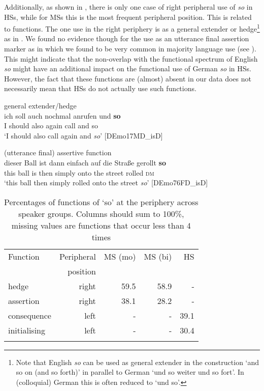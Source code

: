 \documentclass[output=paper,colorlinks,citecolor=brown]{langscibook}
\begin{document}
\noindent Additionally, as shown in , there is only one case of right peripheral use of \textit{so} in HSs, while for MSs this is the most frequent peripheral position. This is related to functions. The one use in the right periphery is as a general extender or hedge\footnote{Note that English \textit{so} can be used as general extender in the construction ‘and so on (and so forth)’ in parallel to German ‘und so weiter und so fort’. In (colloquial) German this is often reduced to ‘und so’.} as in . We found no evidence though for the use as an utterance final assertion marker as in  which we found to be very common in majority language use (see ). This might indicate that the non-overlap with the functional spectrum of English \textit{so} might have an additional impact on the functional use of German \textit{so} in HSs. However, the fact that these functions are (almost) absent in our data does not necessarily mean that HSs do not actually use such functions. 

\ea general extender/hedge\label{ex:labrenzetal:13}\\
\gll ich soll auch nochmal anrufen und \textbf{so}\\ I should also again call and so\\
\glt ‘I should also call again and \textit{so}’ \hfill[DEmo17MD\_isD]
\z

\ea (utterance final) assertive function\label{ex:labrenzetal:14}\\
\gll dieser Ball ist dann einfach auf die Straße gerollt \textbf{so}\\ this ball is then simply onto the street rolled \textsc{dm}\\
\glt ‘this ball then simply rolled onto the street \textit{so}’ \hfill[DEmo76FD\_isD]
\z

\begin{table}
\caption{Percentages of functions of `so' at the periphery across speaker groups. Columns should sum to 100\%, missing values are functions that occur less than 4 times}
\label{tab:labrenzetal:4}
 \begin{tabularx}{.8\textwidth}{X rrrr}
  \lsptoprule
  Function  & Peripheral & MS (mo)  & MS (bi) & HS\\
  & position & & & \\
  \midrule
  hedge  &   right  &    59.5  &    58.9      & -\\
  assertion  &   right &   38.1  &    28.2     & -\\
  consequence  &   left &   -  &    -     & 39.1\\
  initialising  &   left &   -  &    -     & 30.4\\
  \lspbottomrule
 \end{tabularx}
\end{table}
\end{document}
